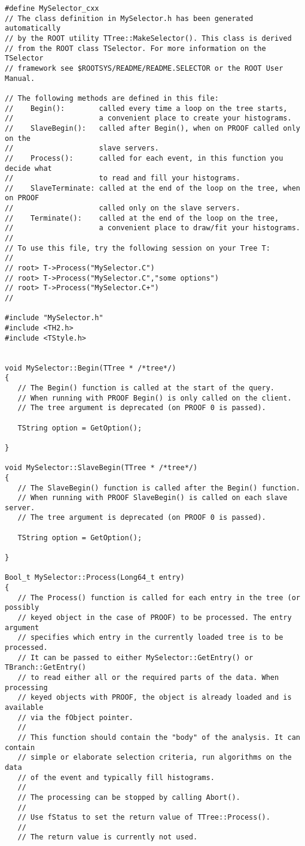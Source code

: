 \documentclass{article}
\begin{document}
\begin{verbatim}
#define MySelector_cxx
// The class definition in MySelector.h has been generated automatically
// by the ROOT utility TTree::MakeSelector(). This class is derived
// from the ROOT class TSelector. For more information on the TSelector
// framework see $ROOTSYS/README/README.SELECTOR or the ROOT User Manual.

// The following methods are defined in this file:
//    Begin():        called every time a loop on the tree starts,
//                    a convenient place to create your histograms.
//    SlaveBegin():   called after Begin(), when on PROOF called only on the
//                    slave servers.
//    Process():      called for each event, in this function you decide what
//                    to read and fill your histograms.
//    SlaveTerminate: called at the end of the loop on the tree, when on PROOF
//                    called only on the slave servers.
//    Terminate():    called at the end of the loop on the tree,
//                    a convenient place to draw/fit your histograms.
//
// To use this file, try the following session on your Tree T:
//
// root> T->Process("MySelector.C")
// root> T->Process("MySelector.C","some options")
// root> T->Process("MySelector.C+")
//

#include "MySelector.h"
#include <TH2.h>
#include <TStyle.h>


void MySelector::Begin(TTree * /*tree*/)
{
   // The Begin() function is called at the start of the query.
   // When running with PROOF Begin() is only called on the client.
   // The tree argument is deprecated (on PROOF 0 is passed).

   TString option = GetOption();

}

void MySelector::SlaveBegin(TTree * /*tree*/)
{
   // The SlaveBegin() function is called after the Begin() function.
   // When running with PROOF SlaveBegin() is called on each slave server.
   // The tree argument is deprecated (on PROOF 0 is passed).

   TString option = GetOption();

}

Bool_t MySelector::Process(Long64_t entry)
{
   // The Process() function is called for each entry in the tree (or possibly
   // keyed object in the case of PROOF) to be processed. The entry argument
   // specifies which entry in the currently loaded tree is to be processed.
   // It can be passed to either MySelector::GetEntry() or TBranch::GetEntry()
   // to read either all or the required parts of the data. When processing
   // keyed objects with PROOF, the object is already loaded and is available
   // via the fObject pointer.
   //
   // This function should contain the "body" of the analysis. It can contain
   // simple or elaborate selection criteria, run algorithms on the data
   // of the event and typically fill histograms.
   //
   // The processing can be stopped by calling Abort().
   //
   // Use fStatus to set the return value of TTree::Process().
   //
   // The return value is currently not used.


\end{verbatim}
\end{document}
